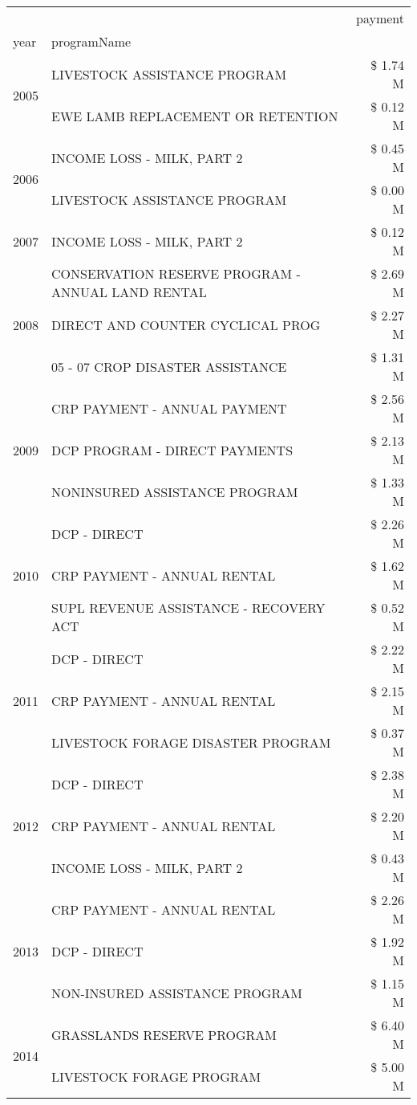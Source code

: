 \begin{tabular}{llr}
\toprule
 &  & payment \\
year & programName &  \\
\midrule
\multirow[t]{2}{*}{2005} & LIVESTOCK ASSISTANCE PROGRAM & \$ 1.74 M \\
 & EWE LAMB REPLACEMENT OR RETENTION & \$ 0.12 M \\
\cline{1-3}
\multirow[t]{2}{*}{2006} & INCOME LOSS - MILK, PART 2 & \$ 0.45 M \\
 & LIVESTOCK ASSISTANCE PROGRAM & \$ 0.00 M \\
\cline{1-3}
2007 & INCOME LOSS - MILK, PART 2 & \$ 0.12 M \\
\cline{1-3}
\multirow[t]{3}{*}{2008} & CONSERVATION RESERVE PROGRAM - ANNUAL LAND RENTAL & \$ 2.69 M \\
 & DIRECT AND COUNTER CYCLICAL PROG & \$ 2.27 M \\
 & 05 - 07 CROP DISASTER ASSISTANCE & \$ 1.31 M \\
\cline{1-3}
\multirow[t]{3}{*}{2009} & CRP PAYMENT - ANNUAL PAYMENT & \$ 2.56 M \\
 & DCP PROGRAM - DIRECT PAYMENTS & \$ 2.13 M \\
 & NONINSURED ASSISTANCE PROGRAM & \$ 1.33 M \\
\cline{1-3}
\multirow[t]{3}{*}{2010} & DCP - DIRECT & \$ 2.26 M \\
 & CRP PAYMENT - ANNUAL RENTAL & \$ 1.62 M \\
 & SUPL REVENUE ASSISTANCE - RECOVERY ACT & \$ 0.52 M \\
\cline{1-3}
\multirow[t]{3}{*}{2011} & DCP - DIRECT & \$ 2.22 M \\
 & CRP PAYMENT - ANNUAL RENTAL & \$ 2.15 M \\
 & LIVESTOCK FORAGE DISASTER PROGRAM & \$ 0.37 M \\
\cline{1-3}
\multirow[t]{3}{*}{2012} & DCP - DIRECT & \$ 2.38 M \\
 & CRP PAYMENT - ANNUAL RENTAL & \$ 2.20 M \\
 & INCOME LOSS - MILK, PART 2 & \$ 0.43 M \\
\cline{1-3}
\multirow[t]{3}{*}{2013} & CRP PAYMENT - ANNUAL RENTAL & \$ 2.26 M \\
 & DCP - DIRECT & \$ 1.92 M \\
 & NON-INSURED ASSISTANCE PROGRAM & \$ 1.15 M \\
\cline{1-3}
\multirow[t]{3}{*}{2014} & GRASSLANDS RESERVE PROGRAM & \$ 6.40 M \\
 & LIVESTOCK FORAGE PROGRAM & \$ 5.00 M \\

\end{tabular}
